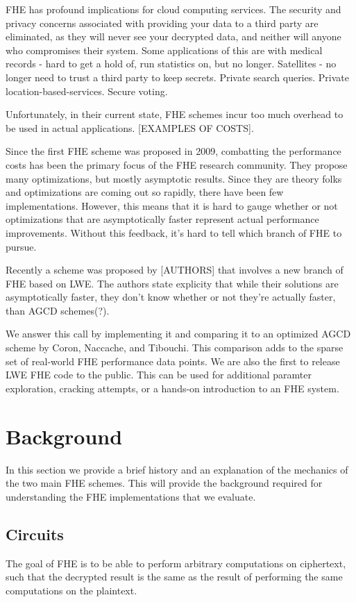 \documentclass[letterpaper,twocolumn,10pt]{article}
\begin{document}
FHE has profound implications for cloud computing services. The security and privacy concerns associated with providing your data to a third party are eliminated, as they will never see your decrypted data, and neither will anyone who compromises their system. Some applications of this are with medical records - hard to get a hold of, run statistics on, but no longer. Satellites - no longer need to trust a third party to keep secrets. Private search queries. Private location-based-services. Secure voting.

Unfortunately, in their current state, FHE schemes incur too much overhead to be used in actual applications. [EXAMPLES OF COSTS]. 

Since the first FHE scheme was proposed in 2009, combatting the performance costs has been the primary focus of the FHE research community. They propose many optimizations, but mostly asymptotic results. Since they are theory folks and optimizations are coming out so rapidly, there have been few implementations. However, this means that it is hard to gauge whether or not optimizations that are asymptotically faster represent actual performance improvements. Without this feedback, it's hard to tell which branch of FHE to pursue.

Recently a scheme was proposed by [AUTHORS] that involves a new branch of FHE based on LWE. The authors state explicity that while their solutions are asymptotically faster, they don't know whether or not they're actually faster, than AGCD schemes(?).

We answer this call by implementing it and comparing it to an optimized AGCD scheme by Coron, Naccache, and Tibouchi. This comparison adds to the sparse set of real-world FHE performance data points. We are also the first to release LWE FHE code to the public. This can be used for additional paramter exploration, cracking attempts, or a hands-on introduction to an FHE system.


\section{Background}
In this section we provide a brief history and an explanation of the mechanics of the two main FHE schemes. This will provide the background required for understanding the FHE implementations that we evaluate.

\subsection{Circuits}
The goal of FHE is to be able to perform arbitrary computations on ciphertext, such that the decrypted result is the same as the result of performing the same computations on the plaintext.
\end{document}
